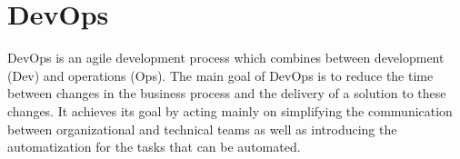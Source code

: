 \section{DevOps}
\label{sec:DevOps}
DevOps \cite{brunnert2015performance} is an agile development process which combines between development (Dev) and operations (Ops). The main goal of DevOps is to reduce the time between changes in the business process and the delivery of a solution to these changes. It achieves its goal by acting mainly on simplifying the communication between organizational and technical teams as well as introducing the automatization for the tasks that can be automated. 







